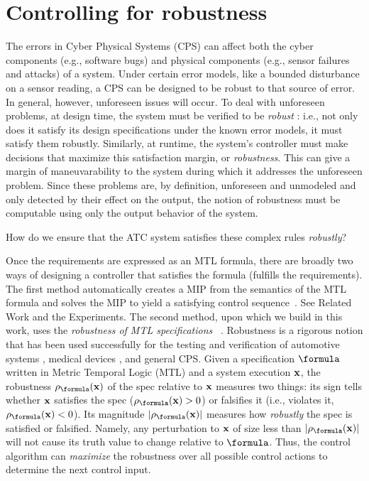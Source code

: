 \section{Controlling for robustness}
\label{sec:intro}
The errors in Cyber Physical Systems (CPS) can affect both the cyber components (e.g., software bugs) and physical components (e.g., sensor failures and attacks) of a system. Under certain error models, like a bounded disturbance on a sensor reading, a CPS can be designed to be robust to that source of error.
In general, however, unforeseen issues will occur. 
To deal with unforeseen problems, at design time, the system must be verified to be \textit{robust} : i.e., not only does it satisfy its design specifications under the known error models, it must satisfy them robustly.
Similarly, at runtime, the system's controller must make decisions that maximize this satisfaction margin, or \textit{robustness}.
This can give a margin of maneuvarability to the system during which it addresses the unforeseen problem.
Since these problems are, by definition, unforeseen and unmodeled and only detected by their effect on the output, the notion of robustness must be computable using only the output behavior of the system.



How do we ensure that the ATC system satisfies these complex rules \textit{robustly}?



Once the requirements are expressed as an MTL formula, there are broadly two ways of designing a controller that satisfies the formula (fulfills the requirements).
The first method automatically creates a MIP from the semantics of the MTL formula and solves the MIP to yield a satisfying control sequence~\cite{Raman14_MPCSTL,Saha_acc16}.
See Related Work and the Experiments.
The second method, upon which we build in this work, uses the \textit{robustness of MTL specifications}~\cite{Fainekos2006_TLVerifSimu,Donze2010} .
Robustness is a rigorous notion that has been used successfully for the testing and verification of automotive systems \cite{Fainekos12_Automotive,Dreossi15_RRTFalsification}, medical devices \cite{SankaranarayananF2012cmsb}, and general CPS.
Given a specification $\formula$ written in Metric Temporal Logic (MTL) and a system execution $\mathbf{x}$, the robustness $\robf(\sstraj)$ of the spec relative to $\mathbf{x}$ measures two things:
its sign tells whether $\mathbf{x}$ satisfies the spec ($\robf(\sstraj) > 0$) or falsifies it (i.e., violates it, $\robf(\sstraj) <0$).
Its magnitude $|\robf(\sstraj)|$ measures how \textit{robustly} the spec is satisfied or falsified.
Namely, any perturbation to $\mathbf{x}$ of size less than $|\robf(\sstraj)|$ will not cause its truth value to change relative to $\formula$.
Thus, the control algorithm can \textit{maximize} the robustness over all possible control actions to determine the next control input.

